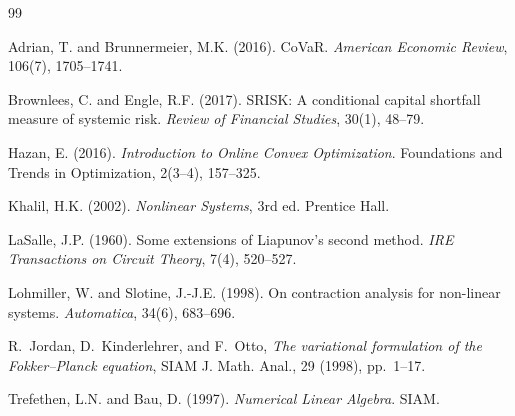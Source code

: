 \documentclass[11pt]{article}
\theoremstyle{definition}
\begin{document}

% 
\begin{thebibliography}{99}

Adrian, T. and Brunnermeier, M.K. (2016).
CoVaR.
\textit{American Economic Review}, 106(7), 1705--1741.

Brownlees, C. and Engle, R.F. (2017).
SRISK: A conditional capital shortfall measure of systemic risk.
\textit{Review of Financial Studies}, 30(1), 48--79.

Hazan, E. (2016).
\textit{Introduction to Online Convex Optimization}.
Foundations and Trends in Optimization, 2(3--4), 157--325.

Khalil, H.K. (2002).
\textit{Nonlinear Systems}, 3rd ed.
Prentice Hall.

LaSalle, J.P. (1960).
Some extensions of Liapunov's second method.
\textit{IRE Transactions on Circuit Theory}, 7(4), 520--527.

Lohmiller, W. and Slotine, J.-J.E. (1998).
On contraction analysis for non-linear systems.
\textit{Automatica}, 34(6), 683--696.

R.~Jordan, D.~Kinderlehrer, and F.~Otto,
\textit{The variational formulation of the Fokker--Planck equation},
SIAM J. Math. Anal., 29 (1998), pp.~1--17.

Trefethen, L.N. and Bau, D. (1997).
\textit{Numerical Linear Algebra}.
SIAM.

\end{thebibliography}
\end{document}
